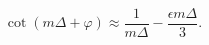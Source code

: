 \begin{equation}
\cot( m \Delta + \varphi)\approx \frac{1}{m \Delta}-
\frac{\epsilon m \Delta}{3}.
\end{equation} 
